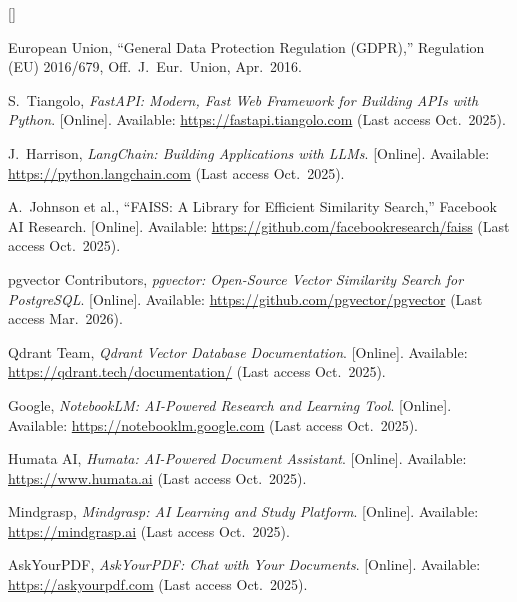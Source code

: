 \documentclass[12pt, a4paper, oneside]{report}
\begin{document}
\begin{list}{[]}{\setlength{\leftmargin}{2.5em}\setlength{\itemsep}{6pt}}
  \item European Union, ``General Data Protection Regulation (GDPR),'' Regulation (EU) 2016/679, Off.\ J.\ Eur.\ Union, Apr.\ 2016.

  \item S.\ Tiangolo, \textit{FastAPI: Modern, Fast Web Framework for Building APIs with Python}. [Online]. Available: \url{https://fastapi.tiangolo.com} (Last access Oct.\ 2025).

  \item J.\ Harrison, \textit{LangChain: Building Applications with LLMs}. [Online]. Available: \url{https://python.langchain.com} (Last access Oct.\ 2025).

  \item A.\ Johnson et al., ``FAISS: A Library for Efficient Similarity Search,'' Facebook AI Research. [Online]. Available: \url{https://github.com/facebookresearch/faiss} (Last access Oct.\ 2025).

  \item pgvector Contributors, \textit{pgvector: Open-Source Vector Similarity Search for PostgreSQL}. [Online]. Available: \url{https://github.com/pgvector/pgvector} (Last access Mar.\ 2026).

  \item Qdrant Team, \textit{Qdrant Vector Database Documentation}. [Online]. Available: \url{https://qdrant.tech/documentation/} (Last access Oct.\ 2025).

  \item Google, \textit{NotebookLM: AI-Powered Research and Learning Tool}. [Online]. Available: \url{https://notebooklm.google.com} (Last access Oct.\ 2025).

  \item Humata AI, \textit{Humata: AI-Powered Document Assistant}. [Online]. Available: \url{https://www.humata.ai} (Last access Oct.\ 2025).

  \item Mindgrasp, \textit{Mindgrasp: AI Learning and Study Platform}. [Online]. Available: \url{https://mindgrasp.ai} (Last access Oct.\ 2025).

  \item AskYourPDF, \textit{AskYourPDF: Chat with Your Documents}. [Online]. Available: \url{https://askyourpdf.com} (Last access Oct.\ 2025).

\end{list}
\end{document}
